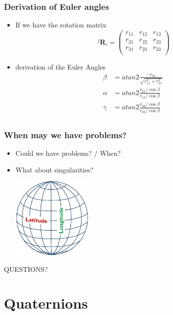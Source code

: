 \documentclass[10pt]{beamer}
\begin{document}
\begin{frame}
  \frametitle{Derivation of Euler angles}
  \begin{itemize}
  \item If we have the rotation matrix
    \[
      ~^{j}\mathbf{R}_i = \left(
        \begin{array}{ccc}
          r_{11} & r_{12} & r_{13}  \\
          r_{21} & r_{22} & r_{23}  \\
          r_{31} & r_{23} & r_{33}  \\
        \end{array}
      \right)
    \]
  \item derivation of the Euler Angles
    \[
      \begin{array}{cc}
        \beta   & = atan2 \frac{-r_{31}}{\sqrt{r_{11}^2 + r_{21}^2}} \\
        \alpha  & = atan2 \frac{r_{21} / \cos \beta}{r_{11} / \cos \beta}\\
        \gamma  & = atan2 \frac{r_{32} / \cos \beta}{r_{33} / \cos \beta}\\
      \end{array}
    \]
  \end{itemize}
\end{frame}

\begin{frame}
  \frametitle{When may we have problems?}
  \begin{itemize}
  \item Could we have problems? / When?
    \pause
  \item What about singularities?
    \centerline{\includegraphics[height=4cm]{lat-long}}
  \end{itemize}
\end{frame}

\begin{frame}
  \centerline{\Huge QUESTIONS?}
\end{frame}


\section{Quaternions}
\end{document}
